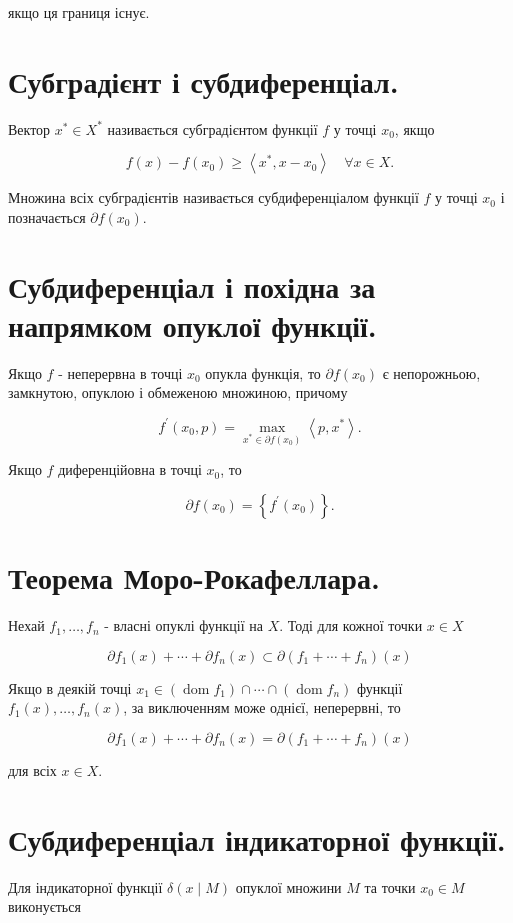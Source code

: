\documentclass[10pt]{article}
\begin{document}
якщо ця границя існує.

\section*{Субградієнт і субдиференціал.}
Вектор $x^{*} \in X^{*}$ називається субградієнтом функції $f$ у точці $x_{0}$, якщо

$$
f(x)-f\left(x_{0}\right) \geq\left\langle x^{*}, x-x_{0}\right\rangle \quad \forall x \in X .
$$

Множина всіх субградієнтів називається субдиференціалом функції $f$ у точці $x_{0}$ і позначається $\partial f\left(x_{0}\right)$.

\section*{Субдиференціал і похідна за напрямком опуклої функції.}
Якщо $f$ - неперервна в точці $x_{0}$ опукла функція, то $\partial f\left(x_{0}\right)$ є непорожньою, замкнутою, опуклою і обмеженою множиною, причому

$$
f^{\prime}\left(x_{0}, p\right)=\max _{x^{*} \in \partial f\left(x_{0}\right)}\left\langle p, x^{*}\right\rangle .
$$

Якщо $f$ диференційовна в точці $x_{0}$, то

$$
\partial f\left(x_{0}\right)=\left\{f^{\prime}\left(x_{0}\right)\right\} .
$$

\section*{Теорема Моро-Рокафеллара.}
Нехай $f_{1}, \ldots, f_{n}$ - власні опуклі функції на $X$. Тоді для кожної точки $x \in X$

$$
\partial f_{1}(x)+\cdots+\partial f_{n}(x) \subset \partial\left(f_{1}+\cdots+f_{n}\right)(x)
$$

Якщо в деякій точці $x_{1} \in\left(\operatorname{dom} f_{1}\right) \cap \cdots \cap\left(\operatorname{dom} f_{n}\right)$ функції $f_{1}(x), \ldots, f_{n}(x)$, за виключенням може однієї, неперервні, то

$$
\partial f_{1}(x)+\cdots+\partial f_{n}(x)=\partial\left(f_{1}+\cdots+f_{n}\right)(x)
$$

для всіх $x \in X$.

\section*{Субдиференціал індикаторної функції.}
Для індикаторної функції $\delta(x \mid M)$ опуклої множини $M$ та точки $x_{0} \in M$ виконується
\end{document}
